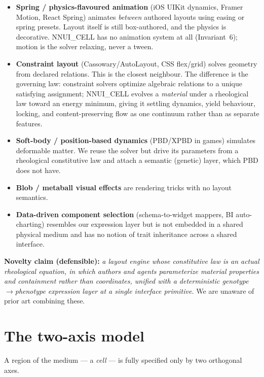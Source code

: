 \documentclass[11pt]{article}
\begin{document}
\begin{itemize}[leftmargin=1.4em]
  \item \textbf{Spring / physics-flavoured animation} (iOS UIKit dynamics, Framer Motion, React
  Spring) animates \emph{between} authored layouts using easing or spring presets. Layout itself
  is still box-authored, and the physics is decorative. NNUI\_CELL has no animation system at all
  (Invariant~6); motion is the solver relaxing, never a tween.
  \item \textbf{Constraint layout} (Cassowary/AutoLayout, CSS flex/grid) solves geometry from
  declared relations. This is the closest neighbour. The difference is the governing law:
  constraint solvers optimize algebraic relations to a unique satisfying assignment; NNUI\_CELL
  evolves a \emph{material} under a rheological law toward an energy minimum, giving it settling
  dynamics, yield behaviour, locking, and content-preserving flow as one continuum rather than
  as separate features.
  \item \textbf{Soft-body / position-based dynamics} (PBD/XPBD in games) simulates deformable
  matter. We reuse the solver but drive its parameters from a rheological constitutive law and
  attach a semantic (genetic) layer, which PBD does not have.
  \item \textbf{Blob / metaball visual effects} are rendering tricks with no layout semantics.
  \item \textbf{Data-driven component selection} (schema-to-widget mappers, BI auto-charting)
  resembles our expression layer but is not embedded in a shared physical medium and has no
  notion of trait inheritance across a shared interface.
\end{itemize}

\noindent\textbf{Novelty claim (defensible):} \emph{a layout engine whose constitutive law is an
actual rheological equation, in which authors and agents parameterize material properties and
containment rather than coordinates, unified with a deterministic genotype$\rightarrow$phenotype
expression layer at a single interface primitive.} We are unaware of prior art combining these.

\section{The two-axis model}

A region of the medium --- a \emph{cell} --- is fully specified only by two orthogonal axes.
\end{document}

